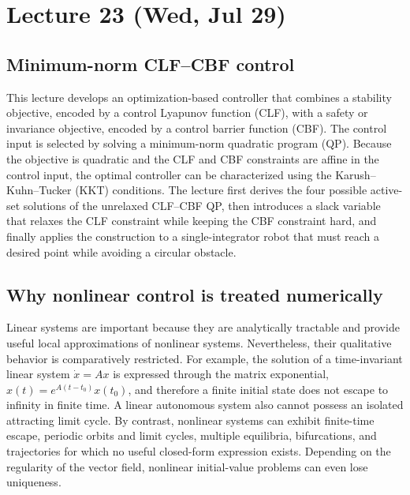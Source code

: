 \documentclass[../../master-handout.tex]{subfiles}
\begin{document}
\section{Lecture 23 (Wed, Jul 29)}

\subsection{Minimum-norm CLF--CBF control}

This lecture develops an optimization-based controller that combines a stability objective, encoded by a control Lyapunov function (CLF), with a safety or invariance objective, encoded by a control barrier function (CBF). The control input is selected by solving a minimum-norm quadratic program (QP). Because the objective is quadratic and the CLF and CBF constraints are affine in the control input, the optimal controller can be characterized using the Karush--Kuhn--Tucker (KKT) conditions. The lecture first derives the four possible active-set solutions of the unrelaxed CLF--CBF QP, then introduces a slack variable that relaxes the CLF constraint while keeping the CBF constraint hard, and finally applies the construction to a single-integrator robot that must reach a desired point while avoiding a circular obstacle.

\subsection{Why nonlinear control is treated numerically}

Linear systems are important because they are analytically tractable and provide useful local approximations of nonlinear systems. Nevertheless, their qualitative behavior is comparatively restricted. For example, the solution of a time-invariant linear system $\dot{x}=Ax$ is expressed through the matrix exponential, $x(t)=e^{A(t-t_0)}x(t_0)$, and therefore a finite initial state does not escape to infinity in finite time. A linear autonomous system also cannot possess an isolated attracting limit cycle. By contrast, nonlinear systems can exhibit finite-time escape, periodic orbits and limit cycles, multiple equilibria, bifurcations, and trajectories for which no useful closed-form expression exists. Depending on the regularity of the vector field, nonlinear initial-value problems can even lose uniqueness.
\end{document}
